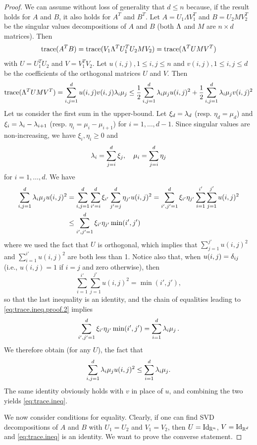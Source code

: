\begin{proof}
We can assume without loss of generality that $d\leq n$ because, if the result holds for $A$ and $B$, it also holds for $A^T$ and $B^T$. Let $A = U_1 \Lambda V_1^T$ and $B = U_2 M V_2^T$ be the singular values decompositions of $A$ and $B$ (both $\Lambda$ and $M$ are $n\times d$ matrices). Then 
\[
{\mathrm{trace}}(A^TB) = {\mathrm{trace}}(V_1 \Lambda^T U_1^TU_2 M V_2) = {\mathrm{trace}}(\Lambda^T UMV^T)
\]
with $U = U_1^TU_2$ and $V = V_1^T V_2$. Let $u(i,j), 1\leq i,j\leq n$ and $v(i,j), 1\leq i,j\leq d$ be the coefficients of the orthogonal matrices $U$ and $V$. Then
\begin{equation}
\label{eq:trace.ineq.proof.1}
{\mathrm{trace}}(\Lambda^T UMV^T) = \sum_{i,j=1}^d u(i,j) v(i,j) \lambda_i\mu_j \leq \frac12 \sum_{i,j=1}^d \lambda_i \mu_j u(i,j)^2 + \frac12 \sum_{i,j=1}^d \lambda_i \mu_j v(i,j)^2
 \end{equation}
 Let us consider the first sum in the upper-bound. Let $\xi_d = \lambda_d$ (resp. $\eta_d = \mu_d$) and $\xi_i = \lambda_i - \lambda_{i+1}$ (resp. $\eta_i = \mu_i - \mu_{i+1}$) for $i=1, \ldots, d-1$. Since  singular values are non-increasing, we have $\xi_i, \eta_i\geq 0$  and 
 \[
 \lambda_i = \sum_{j=i}^d \xi_j, \quad  \mu_i = \sum_{j=i}^d \eta_j
 \]
 for $i=1, \ldots, d$. We have
 \begin{align}
 \nonumber
 \sum_{i,j=1}^d \lambda_i \mu_j u(i,j)^2 &=  \sum_{i,j=1}^d \sum_{i'=i}^d\xi_{i'}\sum_{j'=j}^d \eta_{j'}  u(i,j)^2 = \sum_{i',j'=1}^d \xi_{i'}\eta_{j'} \sum_{i=1}^{i'}\sum_{j=1}^{j'} u(i,j)^2\\
 &\leq \sum_{i',j'=1}^d \xi_{i'}\eta_{j'} \min(i', j')
 \label{eq:trace.ineq.proof.2}
 \end{align}
where we used the fact that $U$ is orthogonal, which implies that $\sum_{j=1}^{j'} u(i,j)^2$ and $\sum_{i=1}^{i'} u(i,j)^2$ are both less than 1. Notice also that, when $u(i,j) = \delta_{ij}$ (i.e., $u(i,j)=1$ if $i=j$ and zero otherwise), then
\[
\sum_{i=1}^{i'}\sum_{j=1}^{j'} u(i,j)^2 = \min(i', j'),
\]
so that the last inequality is an identity, and the chain of equalities leading to \cref{eq:trace.ineq.proof.2} implies
\[
\sum_{i',j'=1}^d \xi_{i'}\eta_{j'} \min(i', j') = \sum_{i=1}^d \lambda_i\mu_j\,.
\]
We therefore obtain (for any $U$), the fact that 
\[
 \sum_{i,j=1}^d \lambda_i \mu_j u(i,j)^2 \leq \sum_{i=1}^d \lambda_i\mu_j.
 \]
The  same identity obviously holds with $v$ in place of $u$, and combining the two yields \cref{eq:trace.ineq}.
\bigskip

We now consider conditions for equality. Clearly, if one can find SVD decompositions of $A$ and $B$ with $U_1=U_2$ and $V_1=V_2$, then $U = \Id[n]$, $V=\Id[d]$ and \cref{eq:trace.ineq} is an identity. We want to prove the converse statement.


\end{proof}
